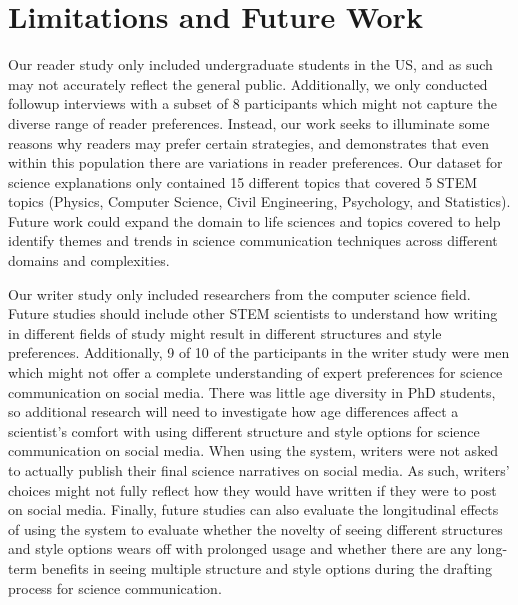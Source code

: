 \section{Limitations and Future Work}
Our reader study only included undergraduate students in the US, and as such may not accurately reflect the general public. Additionally, we only conducted followup interviews with a subset of 8 participants which might not capture the diverse range of reader preferences. Instead, our work seeks to illuminate some reasons why readers may prefer certain strategies, and demonstrates that even within this population there are variations in reader preferences. Our dataset for science explanations only contained 15 different topics that covered 5 STEM topics (Physics, Computer Science, Civil Engineering, Psychology, and Statistics). Future work could expand the domain to life sciences and topics covered to help identify themes and trends in science communication techniques across different domains and complexities.

Our writer study only included researchers from the computer science field. Future studies should include other STEM scientists to understand how writing in different fields of study might result in different structures and style preferences. Additionally, 9 of 10 of the participants in the writer study were men which might not offer a complete understanding of expert preferences for science communication on social media. There was little age diversity in PhD students, so additional research will need to investigate how age differences affect a scientist's comfort with using different structure and style options for science communication on social media. When using the system, writers were not asked to actually publish their final science narratives on social media. As such, writers' choices might not fully reflect how they would have written if they were to post on social media. Finally, future studies can also evaluate the longitudinal effects of using the system to evaluate whether the novelty of seeing different structures and style options wears off with prolonged usage and whether there are any long-term benefits in seeing multiple structure and style options during the drafting process for science communication. 